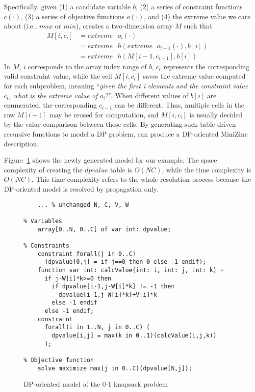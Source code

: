 Specifically, given (1) a candidate variable $b$, (2) a series of constraint functions $c(\cdot)$, (3) a series of objective functions $o(\cdot)$, and (4) the extreme value we care about (i.e., $max$ or $min$), \tool creates a two-dimension array $M$ such that 
\begin{align}
    M[i, c_i]&=extreme\text{ }o_i(\cdot) \nonumber\\
           &=extreme\text{ }h(extreme\text{ }o_{i-1}(\cdot), b[i]) \nonumber \\
           &=extreme\text{ }h(M[i-1, c_{i-1}], b[i]) \tag{3.5}
\end{align}
In $M$, $i$ corresponds to the array index range of $b$,
$c_i$ represents the corresponding valid constraint value, while the cell $M[i, c_i]$ saves the extreme value computed for each subproblem, meaning ``\emph{given the first i elements and the constraint value $c_i$, what is the extreme value of $o_i$}?''. When different values of $b[i]$ are enumerated, the corresponding $c_{i-1}$ can be different. Thus, multiple cells in the row $M[i-1]$ may be reused for computation, and $M[i, c_i]$ is usually decided
by the value comparison between these cells. 
By generating such table-driven recursive functions to model a DP problem, \tool can produce a DP-oriented MiniZinc description. 

Figure~\ref{fig:knapsack2} shows the newly generated model for our example. 
The space complexity of creating the $dpvalue$ table is $O(NC)$, while the time complexity is $O(NC)$. This time complexity refers to the whole resolution process because the DP-oriented model is resolved by propagation only.

	\begin{figure}[htb]
\begin{lstlisting}[frame=single]
% Input arguments
    ... % unchanged N, C, V, W

% Variables
    array[0..N, 0..C] of var int: dpvalue;

% Constraints
    constraint forall(j in 0..C)
      (dpvalue[0,j] = if j==0 then 0 else -1 endif);
    function var int: calcValue(int: i, int: j, int: k) =
      if j-W[i]*k>=0 then
        if dpvalue[i-1,j-W[i]*k] != -1 then
          dpvalue[i-1,j-W[i]*k]+V[i]*k
        else -1 endif
      else -1 endif;
    constraint
      forall(i in 1..N, j in 0..C) (
        dpvalue[i,j] = max(k in 0..1)(calcValue(i,j,k))
      );

% Objective function    
    solve maximize max(j in 0..C)(dpvalue[N,j]);
\end{lstlisting}
\caption{DP-oriented model of the 0-1 knapsack problem}\label{fig:knapsack2}
\end{figure}

